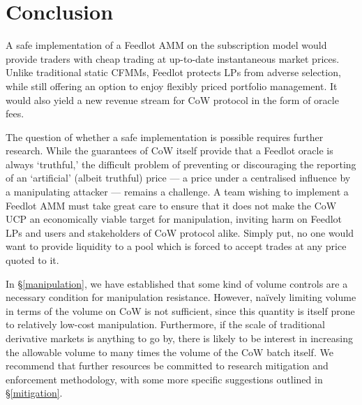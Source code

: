 \documentclass[a4paper,10pt]{article}
\theoremstyle{remark}
\begin{document}

\section{Conclusion}

A safe implementation of a Feedlot AMM on the subscription model would provide traders with cheap trading at up-to-date instantaneous market prices.
%
Unlike traditional static CFMMs, Feedlot protects LPs from adverse selection, while still offering an option to enjoy flexibly priced portfolio management. 
%
It would also yield a new revenue stream for CoW protocol in the form of oracle fees.

The question of whether a safe implementation is possible requires further research.
%
While the guarantees of CoW itself provide that a Feedlot oracle is always `truthful,' the difficult problem of preventing or discouraging the reporting of an `artificial' (albeit truthful) price --- a price under a centralised influence by a manipulating attacker --- remains a challenge. 
%
A team wishing to implement a Feedlot AMM must take great care to ensure that it does not make the CoW UCP an economically viable target for manipulation, inviting harm on Feedlot LPs and users and stakeholders of CoW protocol alike.
%
Simply put, no one would want to provide liquidity to a pool which is forced to accept trades at any price quoted to it.

In \S\ref{manipulation}, we have established that some kind of volume controls are a necessary condition for manipulation resistance.
%
However, na\"ively limiting volume in terms of the volume on CoW is not sufficient, since this quantity is itself prone to relatively low-cost manipulation.
%
Furthermore, if the scale of traditional derivative markets is anything to go by, there is likely to be interest in increasing the allowable volume to many times the volume of the CoW batch itself.
%
We recommend that further resources be committed to research mitigation and enforcement methodology, with some more specific suggestions outlined in \S\ref{mitigation}.


\printbibliography
\end{document}
